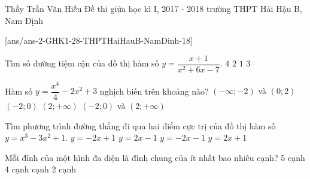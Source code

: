 \begin{name}
{Thầy Trần Văn Hiếu}
{Đề thi giữa học kì I, 2017 - 2018 trường THPT Hải Hậu B, Nam Định}
\end{name}
\setcounter{ex}{0}
[ans/ans-2-GHK1-28-THPTHaiHauB-NamDinh-18]
\begin{ex}%
Tìm số đường tiệm cận của đồ thị hàm số $y=\dfrac{x+1}{x^2+6x-7}$.
\choice
{$4$}
{$2$}
{$1$}
{\True $3$}

\end{ex}

\begin{ex}%

Hàm số $y=\dfrac{x^4}{4}-2x^2+3$ nghịch biến trên khoảng nào?
\choice
{\True $(-\infty ;-2)$ và $(0;2)$}
{$(-2;0)$}
{$(2;+\infty )$}
{$(-2;0)$ và $(2;+\infty )$}
\end{ex}


\begin{ex}%
Tìm phương trình đường thẳng đi qua hai điểm cực trị của đồ thị hàm số $y=x^3-3x^2+1$.
\choice
{\True $y=-2x+1$}
{$y=2x-1$}
{$y=-2x-1$}
{$y=2x+1$}
\end{ex}

\begin{ex}%
Mỗi đỉnh của một hình đa diện là đỉnh chung của ít nhất bao nhiêu cạnh?
\choice
{5 cạnh}
{4 cạnh}
{ cạnh}
{2 cạnh}
\end{ex}

